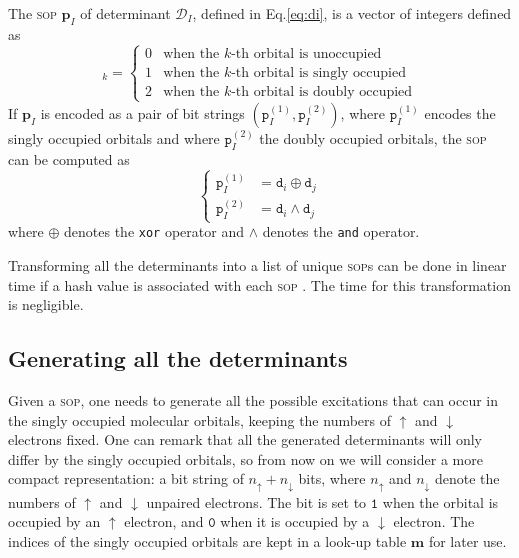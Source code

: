 \documentclass[aip,jcp,reprint,showkeys]{revtex4-1}
\newcommand{\md}{\mathtt{d}}
\newcommand{\mD}{\mathcal{D}}
\newcommand{\mpp}{\mathtt{p}}
\newcommand{\mpv}{\mathbf{p}}
\newcommand{\up}{\uparrow}
\newcommand{\dn}{\downarrow}
\newcommand{\one}{{\texttt{1}}}
\newcommand{\zero}{{\texttt{0}}}
\newcommand{\sop}{\textsc{sop}}
\begin{document}
The {\sop} $\mpv_I$ of determinant $\mD_I$, 
defined in Eq.\eqref{eq:di},
is a vector of integers defined as
\begin{equation}
  [\mpv_I]_k = 
  \begin{cases} 
    0 & \text{when the $k$-th orbital is unoccupied} \\
    1 & \text{when the $k$-th orbital is singly occupied} \\
    2 & \text{when the $k$-th orbital is doubly occupied}
  \end{cases} 
\end{equation}
If $\mpv_I$ is encoded as a pair of bit strings $(\mpp_I^{(1)}, \mpp_I^{(2)})$, where
$\mpp_I^{(1)}$ encodes the singly occupied orbitals and where $\mpp_I^{(2)}$ the doubly
occupied orbitals, the {\sop} can be computed as
\begin{equation}
\label{eq:sop}
\begin{cases}
  \mpp_I^{(1)} & = \md_i \oplus \md_j \\
  \mpp_I^{(2)} & = \md_i \wedge \md_j 
  \end{cases} 
\end{equation}
where $\oplus$ denotes the \texttt{xor} operator and $\wedge$ denotes the
\texttt{and} operator.

Transforming all the determinants into a list of unique \sop s can be done
in linear time if a hash value is associated with each \sop
.\cite{Bitton_1983} The time for this transformation is negligible.


\subsection{Generating all the determinants}

Given a {\sop}, one needs to generate all the possible excitations that can
occur in the singly occupied molecular orbitals, keeping the numbers of $\up$
and $\dn$ electrons fixed.
One can remark that all the generated determinants will only differ by the
singly occupied orbitals, so from now on we will consider a more compact
representation: a bit string of
$n_\up + n_\dn$ bits, where $n_\up$ and $n_\dn$ denote the numbers of $\up$ and
$\dn$ unpaired electrons. The bit is set to $\one$ when the orbital is occupied
by an $\up$ electron, and $\zero$ when it is occupied by a $\dn$ electron.
The indices of the singly occupied orbitals are kept in a look-up table
$\mathbf{m}$ for later use.
\end{document}
